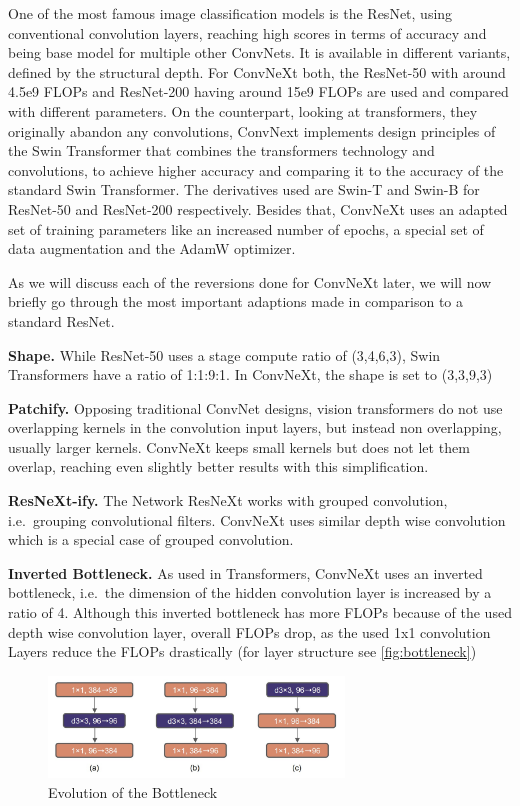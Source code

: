 \documentclass{article}
\begin{document}
One of the most famous image classification models is the ResNet, using conventional convolution layers, reaching high scores in terms of accuracy and being base model for multiple other ConvNets.
It is available in different variants, defined by the structural depth.
For ConvNeXt both, the ResNet-50 with around 4.5e9 FLOPs and ResNet-200 having around 15e9 FLOPs are used and compared with different parameters.
On the counterpart, looking at transformers, they originally abandon any convolutions, ConvNext implements design principles of the Swin Transformer that combines the transformers technology and convolutions, to achieve higher accuracy and comparing it to the accuracy of the standard Swin Transformer.
The derivatives used are Swin-T and Swin-B for ResNet-50 and ResNet-200 respectively.
Besides that, ConvNeXt uses an adapted set of training parameters like an increased number of epochs, a special set of data augmentation and the AdamW optimizer.

As we will discuss each of the reversions done for ConvNeXt later, we will now briefly go through the most important adaptions made in comparison to a standard ResNet.

\textbf{Shape.}
While ResNet-50 uses a stage compute ratio of (3,4,6,3), Swin Transformers have a ratio of 1:1:9:1.
In ConvNeXt, the shape is set to (3,3,9,3)

\textbf{Patchify.}
Opposing traditional ConvNet designs, vision transformers do not use overlapping kernels in the convolution input layers, but instead non overlapping, usually larger kernels.
ConvNeXt keeps small kernels but does not let them overlap, reaching even slightly better results with this simplification.

\textbf{ResNeXt-ify.}
The Network ResNeXt works with grouped convolution, i.e.\ grouping convolutional filters.
ConvNeXt uses similar depth wise convolution which is a special case of grouped convolution.

\textbf{Inverted Bottleneck.}
As used in Transformers, ConvNeXt uses an inverted bottleneck, i.e.\ the dimension of the hidden convolution layer is increased by a ratio of 4.
Although this inverted bottleneck has more FLOPs because of the used depth wise convolution layer, overall FLOPs drop, as the used 1x1 convolution Layers reduce the FLOPs drastically (for layer structure see \autoref{fig:bottleneck})
\begin{figure}[h]
    \centering
    \includegraphics[width=0.7\textwidth]{images/bottleneck}
    \caption{Evolution of the Bottleneck\cite{liu2022convnet}}
    \label{fig:bottleneck}
\end{figure}
\end{document}
